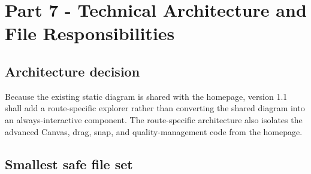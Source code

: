 \documentclass[11pt,letterpaper]{article}
\begin{document}
\section{Part 7 - Technical Architecture and File Responsibilities}
\subsection{Architecture decision}
Because the existing static diagram is shared with the homepage, version 1.1 shall add a route-specific explorer rather than converting the shared diagram into an always-interactive component. The route-specific architecture also isolates the advanced Canvas, drag, snap, and quality-management code from the homepage.

\subsection{Smallest safe file set}
\end{document}
